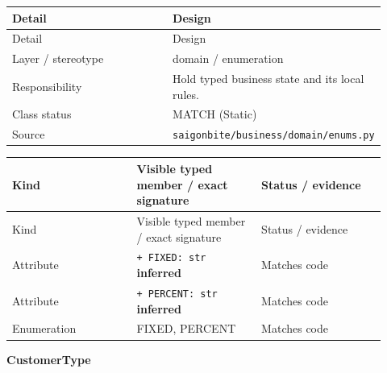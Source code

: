 \begin{longtable}{>{\raggedright\arraybackslash}p{0.4600\linewidth}>{\raggedright\arraybackslash}p{0.4600\linewidth}}
Detail & Design \\
\hline\endfirsthead
Detail & Design \\
\hline\endhead
Layer / stereotype & domain / \guillemotleft{}enumeration\guillemotright{} \\
Responsibility & Hold typed business state and its local rules. \\
Class status & MATCH (Static) \\
Source & \texttt{saigonbite/\allowbreak{}business/\allowbreak{}domain/\allowbreak{}enums.\allowbreak{}py} \\
\end{longtable}
\begin{longtable}{>{\raggedright\arraybackslash}p{0.3067\linewidth}>{\raggedright\arraybackslash}p{0.3067\linewidth}>{\raggedright\arraybackslash}p{0.3067\linewidth}}
Kind & Visible typed member / exact signature & Status / evidence \\
\hline\endfirsthead
Kind & Visible typed member / exact signature & Status / evidence \\
\hline\endhead
Attribute & \texttt{+ FIXED: str} \textbf{inferred} & Matches code \\
Attribute & \texttt{+ PERCENT: str} \textbf{inferred} & Matches code \\
Enumeration & FIXED, PERCENT & Matches code \\
\end{longtable}
\textbf{CustomerType}

